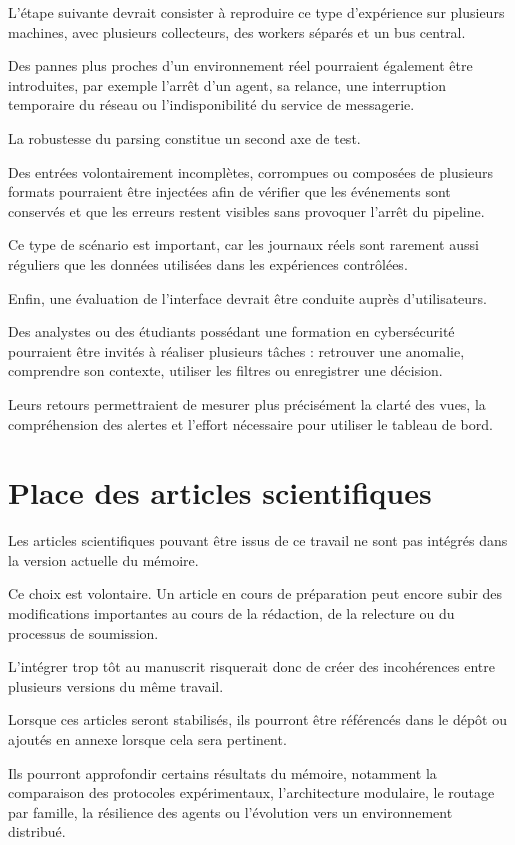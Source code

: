 L'étape suivante devrait consister à reproduire ce type d'expérience sur plusieurs machines, avec plusieurs collecteurs, des workers séparés et un bus central.

Des pannes plus proches d'un environnement réel pourraient également être introduites, par exemple l'arrêt d'un agent, sa relance, une interruption temporaire du réseau ou l'indisponibilité du service de messagerie.

La robustesse du parsing constitue un second axe de test.

Des entrées volontairement incomplètes, corrompues ou composées de plusieurs formats pourraient être injectées afin de vérifier que les événements sont conservés et que les erreurs restent visibles sans provoquer l'arrêt du pipeline.

Ce type de scénario est important, car les journaux réels sont rarement aussi réguliers que les données utilisées dans les expériences contrôlées.

Enfin, une évaluation de l'interface devrait être conduite auprès d'utilisateurs.

Des analystes ou des étudiants possédant une formation en cybersécurité pourraient être invités à réaliser plusieurs tâches : retrouver une anomalie, comprendre son contexte, utiliser les filtres ou enregistrer une décision.

Leurs retours permettraient de mesurer plus précisément la clarté des vues, la compréhension des alertes et l'effort nécessaire pour utiliser le tableau de bord.

\section{Place des articles scientifiques}

Les articles scientifiques pouvant être issus de ce travail ne sont pas intégrés dans la version actuelle du mémoire.

Ce choix est volontaire. Un article en cours de préparation peut encore subir des modifications importantes au cours de la rédaction, de la relecture ou du processus de soumission.

L'intégrer trop tôt au manuscrit risquerait donc de créer des incohérences entre plusieurs versions du même travail.

Lorsque ces articles seront stabilisés, ils pourront être référencés dans le dépôt ou ajoutés en annexe lorsque cela sera pertinent.

Ils pourront approfondir certains résultats du mémoire, notamment la comparaison des protocoles expérimentaux, l'architecture modulaire, le routage par famille, la résilience des agents ou l'évolution vers un environnement distribué.

